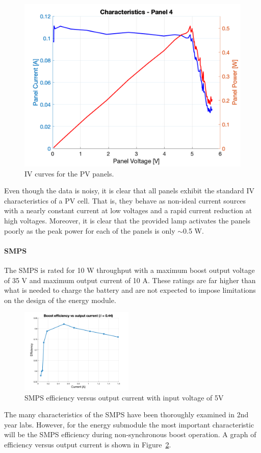 \documentclass[a4paper]{article}
\begin{document}
\begin{figure}[H]
    \includegraphics[scale=0.18]{Panel4.png}
    \caption{IV curves for the PV panels.}
    \label{fig:IV_curve}
\end{figure}

Even though the data is noisy, it is clear that all panels exhibit the 
standard IV characteristics of a PV cell. That is, they behave as 
non-ideal current sources with a nearly constant current at low 
voltages and a rapid current reduction at high voltages\cite{green}. 
Moreover, it is clear that the provided lamp activates the panels poorly 
as the peak power for each of the panels is only $\sim$0.5 W.

\paragraph*{SMPS}

The SMPS is rated for 10 W throughput with a maximum boost output voltage 
of 35 V and maximum output current of 10 A\cite{SMPS_lab}. These ratings 
are far higher than what is needed to charge the battery and are not 
expected to impose limitations on the design of the energy module. 
\begin{figure}
    \centering
    \includegraphics[width=0.48\textwidth]{Boost_efficiency_wduty.png}
    \caption{SMPS efficiency versus output current with input voltage of 5V\cite{powerLogbook}}
    \label{fig:efficiency}
\end{figure}
The many characteristics of the SMPS have been thoroughly examined in 
2nd year labs. However, for the energy submodule the most important 
characteristic will be the SMPS efficiency during non-synchronous 
boost operation. A graph of efficiency versus output current is shown 
in Figure~\ref{fig:efficiency}.
\end{document}
